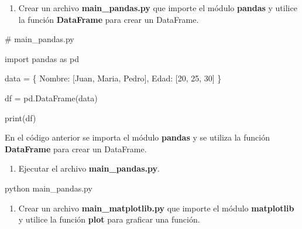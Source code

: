 \documentclass[
  a4paper,
  DIV=11,
  numbers=noendperiod,
  onepage,
  openany]{scrreprt}
\newenvironment{Shaded}{\begin{snugshade}}{\end{snugshade}}
\newcommand{\BuiltInTok}[1]{\textcolor[rgb]{0.00,0.23,0.31}{#1}}
\newcommand{\CommentTok}[1]{\textcolor[rgb]{0.37,0.37,0.37}{#1}}
\newcommand{\DecValTok}[1]{\textcolor[rgb]{0.68,0.00,0.00}{#1}}
\newcommand{\ExtensionTok}[1]{\textcolor[rgb]{0.00,0.23,0.31}{#1}}
\newcommand{\ImportTok}[1]{\textcolor[rgb]{0.00,0.46,0.62}{#1}}
\newcommand{\NormalTok}[1]{\textcolor[rgb]{0.00,0.23,0.31}{#1}}
\newcommand{\OperatorTok}[1]{\textcolor[rgb]{0.37,0.37,0.37}{#1}}
\newcommand{\StringTok}[1]{\textcolor[rgb]{0.13,0.47,0.30}{#1}}
\providecommand{\tightlist}{%
  \setlength{\itemsep}{0pt}\setlength{\parskip}{0pt}}\usepackage{longtable,booktabs,array}
\begin{document}
\begin{enumerate}
\def\labelenumi{\arabic{enumi}.}
\setcounter{enumi}{6}
\tightlist
\item
  Crear un archivo \textbf{main\_pandas.py} que importe el módulo
  \textbf{pandas} y utilice la función \textbf{DataFrame} para crear un
  DataFrame.
\end{enumerate}

\begin{Shaded}
\begin{Highlighting}[]
\CommentTok{\# main\_pandas.py}

\ImportTok{import}\NormalTok{ pandas }\ImportTok{as}\NormalTok{ pd}

\NormalTok{data }\OperatorTok{=}\NormalTok{ \{}
    \StringTok{\textquotesingle{}Nombre\textquotesingle{}}\NormalTok{: [}\StringTok{\textquotesingle{}Juan\textquotesingle{}}\NormalTok{, }\StringTok{\textquotesingle{}Maria\textquotesingle{}}\NormalTok{, }\StringTok{\textquotesingle{}Pedro\textquotesingle{}}\NormalTok{],}
    \StringTok{\textquotesingle{}Edad\textquotesingle{}}\NormalTok{: [}\DecValTok{20}\NormalTok{, }\DecValTok{25}\NormalTok{, }\DecValTok{30}\NormalTok{]}
\NormalTok{\}}

\NormalTok{df }\OperatorTok{=}\NormalTok{ pd.DataFrame(data)}

\BuiltInTok{print}\NormalTok{(df)}
\end{Highlighting}
\end{Shaded}

En el código anterior se importa el módulo \textbf{pandas} y se utiliza
la función \textbf{DataFrame} para crear un DataFrame.

\begin{enumerate}
\def\labelenumi{\arabic{enumi}.}
\setcounter{enumi}{7}
\tightlist
\item
  Ejecutar el archivo \textbf{main\_pandas.py}.
\end{enumerate}

\begin{Shaded}
\begin{Highlighting}[]
\ExtensionTok{python}\NormalTok{ main\_pandas.py}
\end{Highlighting}
\end{Shaded}

\begin{enumerate}
\def\labelenumi{\arabic{enumi}.}
\setcounter{enumi}{8}
\tightlist
\item
  Crear un archivo \textbf{main\_matplotlib.py} que importe el módulo
  \textbf{matplotlib} y utilice la función \textbf{plot} para graficar
  una función.
\end{enumerate}
\end{document}
